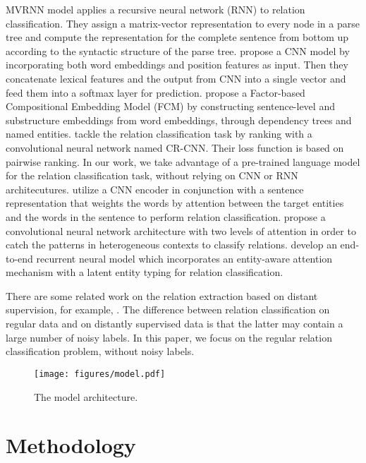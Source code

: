 \documentclass[11pt]{article}
\providecommand{\cite}[1]{\citeauthoryear{#1}}
\renewcommand{\cite}{\citep}
\begin{document}
MVRNN model \cite{Socher_EMNLP_2012} applies a recursive neural network (RNN)
to relation classification. They assign a matrix-vector representation to every node
in a parse tree and compute the representation for the complete sentence from bottom up
according to the syntactic structure of the parse tree. 
\cite{Zeng_coling_2014} propose a CNN model by  
incorporating both word embeddings and position features as input.
Then they concatenate lexical features and the output from CNN  
into a single vector and feed them into a softmax layer for prediction.
\cite{Yu_NIPS_Worksho_2014} propose a Factor-based 
Compositional Embedding Model (FCM) by constructing sentence-level and 
substructure embeddings from word embeddings, through dependency trees and named entities.
\cite{Santos_ACL_2015} tackle the 
relation classification task 
by ranking with a convolutional
neural network named CR-CNN. 
Their loss function is based on pairwise ranking. In our work, we take advantage of a pre-trained language model for
the relation classification task, without relying on CNN or RNN
architecutures.
\cite{Huang_COLING_2016} utilize a CNN encoder in conjunction with a sentence representation that weights the words by attention between the target entities and the words in the sentence to perform relation classification.
\cite{Wang-ACL2016_relation} propose a convolutional
neural network architecture with two levels of attention in order
to catch the patterns in heterogeneous
contexts to classify relations.
\cite{Joohong_Arxiv_2019} develop an end-to-end
recurrent neural model which incorporates an
entity-aware attention mechanism with a latent entity
typing for relation classification.  

There are some related work on the relation extraction based on distant supervision,
for example, \cite{Mintz_ACL_2009,Hoffmann_ACL_2011,Lin_ACL_2016,Ji_AAAI_2017,Wu_AAAI_2019}. The difference
between relation classification on regular data and on distantly supervised data is
that the latter may contain a large number of noisy labels. In this paper, we focus on the
regular relation classification problem, without noisy labels. 
  

\begin{figure*}[!t]
	\centering
	\texttt{[image: figures/model.pdf]}
	\caption{The model architecture. 
	} 
	\label{fig:model_arch}
\end{figure*}




\section{Methodology}  
\label{sec:methods}
\end{document}

